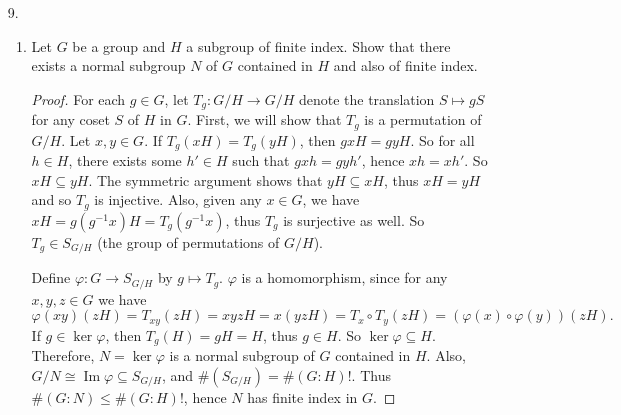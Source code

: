 \documentclass[10pt]{article}
\newcommand{\Z}{\mathbb{Z}}
\DeclareMathOperator*{\im}{Im}
\begin{document}
\begin{enumerate}
\begin{proof}
Denote by $\textbf{c}_x$ the inner automorphism $y \mapsto xyx^{-1}$.  Lang mentions that the association $x \mapsto \textbf{c}_x$ is a homomorphism of $G$ into its automorphism group (since $\cc_x \circ \cc_y (g) = (xy)g(xy)^{-1} = \cc_{xy}(g)$).  Clearly, the kernel of this map is the center $Z$ of $G$, and its image is the subgroup $I$ of inner automorphisms of $G$.  So $G / Z \cong I$.

Subgroups of cyclic groups are cyclic, so $I$ is cyclic and thus so is $G / Z$.  Let $g$ be such that $gZ$ generates $G / Z$.  Then for any $x,y \in G$ there exist $m,n \in \Z$ and $z,w \in Z$ such that $x = g^mz$ and $y = g^n w$.  So
$$
xy = (g^m z)(g^n w) = (g^m g^n) (z w) = (g^n g^m) (w z) = (g^n w) (g^m z) = yx
$$
thus $G$ is abelian.


\end{proof}

\let\cc\undefined

\item[9.]\begin{enumerate}
\item Let $G$ be a group and $H$ a subgroup of finite index.  Show that there exists a normal subgroup $N$ of $G$ contained in $H$ and also of finite index.

\begin{proof}

For each $g \in G$, let $T_g: G / H \rightarrow G/H$ denote the translation $S \mapsto gS$ for any coset $S$ of $H$ in $G$.  First, we will show that $T_g$ is a permutation of $G / H$.  Let $x,y \in G$.  If $T_g(xH) = T_g(yH)$, then $gxH = gyH$.  So for all $h \in H$, there exists some $h' \in H$ such that $gxh = gyh'$, hence $xh = xh'$.  So $xH \subseteq yH$.  The symmetric argument shows that $yH \subseteq xH$, thus $xH = yH$ and so $T_g$ is injective.  Also, given any $x \in G$, we have $xH = g(g^{-1}x)H = T_g(g^{-1}x)$, thus $T_g$ is surjective as well.  So $T_g \in S_{G/H}$ (the group of permutations of $G/H$).

Define $\varphi: G \rightarrow S_{G/H}$ by $g \mapsto T_g$.  $\varphi$ is a homomorphism, since for any $x,y,z \in G$ we have $$\varphi(xy)(zH) = T_{xy}(zH) = xyzH = x(yzH) = T_x \circ T_y (zH) = (\varphi(x)\circ \varphi(y))(zH).$$
If $g \in \ker \varphi$, then $T_g(H) = gH = H$, thus $g \in H$.  So $\ker \varphi \subseteq H$.  Therefore, $N = \ker \varphi$ is a normal subgroup of $G$ contained in $H$.  Also, $G / N \cong \im \varphi \subseteq S_{G/H}$, and $\#(S_{G/H}) = \#(G:H)!$.  Thus $\#(G:N) \leq \#(G:H)!$, hence $N$ has finite index in $G$.


\end{proof}
\end{enumerate}
\end{enumerate}
\end{document}
